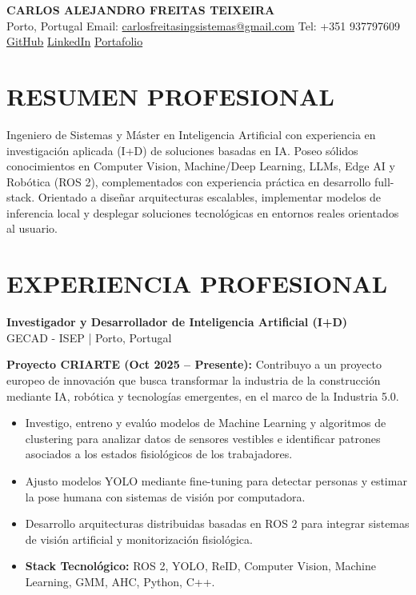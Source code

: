 \documentclass[10pt,a4paper]{article}
\begin{document}
\begin{center}
    {\LARGE\textbf{CARLOS ALEJANDRO FREITAS TEIXEIRA}}\\
    Porto, Portugal \textbar{} Email: \href{mailto:carlosfreitasingsistemas@gmail.com}{carlosfreitasingsistemas@gmail.com}
    \textbar{} Tel: +351 937797609\\
    \href{https://github.com/CarlosFreitasING}{GitHub}
    \textbar{} \href{https://www.linkedin.com/in/carlos-alejandro-freitas-teixeira-82921a249/}{LinkedIn}
    \textbar{} \href{https://carlosfreitas32.wixsite.com/portafolio}{Portafolio}
\end{center}

\section*{RESUMEN PROFESIONAL}
Ingeniero de Sistemas y Máster en Inteligencia Artificial con experiencia en investigación aplicada (I+D) de soluciones basadas en IA. Poseo sólidos conocimientos en Computer Vision, Machine/Deep Learning, LLMs, Edge AI y Robótica (ROS 2), complementados con experiencia práctica en desarrollo full-stack. Orientado a diseñar arquitecturas escalables, implementar modelos de inferencia local y desplegar soluciones tecnológicas en entornos reales orientados al usuario.

\section*{EXPERIENCIA PROFESIONAL}

\textbf{\large Investigador y Desarrollador de Inteligencia Artificial (I+D)}\\
GECAD - ISEP | Porto, Portugal

\vspace{5pt}
\textbf{Proyecto CRIARTE (Oct 2025 -- Presente):} Contribuyo a un proyecto europeo de innovación que busca transformar la industria de la construcción mediante IA, robótica y tecnologías emergentes, en el marco de la Industria 5.0.
\begin{itemize}
    \item Investigo, entreno y evalúo modelos de Machine Learning y algoritmos de clustering para analizar datos de sensores vestibles e identificar patrones asociados a los estados fisiológicos de los trabajadores.
    \item Ajusto modelos YOLO mediante fine-tuning para detectar personas y estimar la pose humana con sistemas de visión por computadora.
    \item Desarrollo arquitecturas distribuidas basadas en ROS 2 para integrar sistemas de visión artificial y monitorización fisiológica.
    \item \textbf{Stack Tecnológico:} ROS 2, YOLO, ReID, Computer Vision, Machine Learning, GMM, AHC, Python, C++.
\end{itemize}
\end{document}
